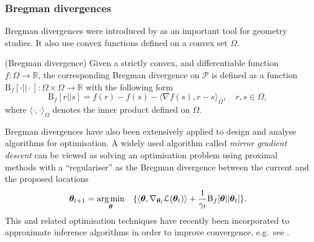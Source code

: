 \subsubsection{Bregman divergences}
Bregman divergences were introduced by \cite{bregman:divergence1967} as an important tool for geometry studies. It also use convex functions defined on a convex set $\Omega$. 
\begin{definition}
(Bregman divergence)
Given a strictly convex, and differentiable function $f: \Omega \rightarrow \mathbb{R}$, the corresponding Bregman divergence on $\mathcal{P}$ is defined as a function $\mathrm{B}_{f}[\cdot || \cdot]: \Omega \times \Omega \rightarrow \mathbb{R}$ with the following form
\begin{equation}
\mathrm{B}_{f}[r||s] = f(r) - f(s) - \langle \nabla f(s), r - s \rangle_{\Omega}, \quad r, s \in \Omega,
\label{eq:chap2_bregman_divergence}
\end{equation}
where $\langle \cdot, \cdot \rangle_{\Omega}$ denotes the inner product defined on $\Omega$.
\label{def:chap2_bregman_divergence}
\end{definition}

Bregman divergences have also been extensively applied to design and analyse algorithms for optimisation. A widely used algorithm called \emph{mirror gradient descent} \citep{nemirovsky:opt1983, beck:mirror_descent2003} can be viewed as solving an optimisation problem using proximal methods with a ``regulariser'' as the Bregman divergence between the current and the proposed locations
\begin{equation}
\bm{\theta}_{t+1} = \operatorname*{arg\,min}_{\bm{\theta}} \quad \{ \langle \bm{\theta}, \nabla_{\bm{\theta}_t} \mathcal{L}(\bm{\theta}_t) \rangle + \frac{1}{\gamma_t} \mathrm{B}_f[\bm{\theta} || \bm{\theta}_t] \}.
\end{equation}
%
This and related optimisation techniques have recently been incorporated to approximate inference algorithms in order to improve convergence, e.g.~see \citet{dai:pmd2015, khan:kl_proximal2015, altosaar:proximity2017}.

